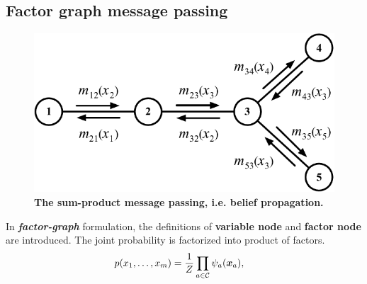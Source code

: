 \documentclass[11pt]{article}
\begin{document}
\subsection{Factor graph message passing}
\begin{figure}
\begin{minipage}[t]{1\linewidth}
  \centering
  \centerline{\includegraphics[scale = 0.3]{belief_prop.png}}
\end{minipage}
\caption{\footnotesize{\textbf{The sum-product message passing, i.e. belief propagation.}}}
\label{fig: tree_decomp}
\end{figure}

In \textbf{\emph{factor-graph}} formulation, the definitions of \textbf{variable node} and \textbf{factor node} are introduced. The joint probability is factorized into product of factors.
\begin{align}
p(x_1, \ldots, x_{m}) &= \frac{1}{Z}\prod_{a \in {\mathcal C}}\psi_{a}(\boldsymbol{x}_{a}),\label{eqn: mrf_graph_factor}
\end{align}
\end{document}
